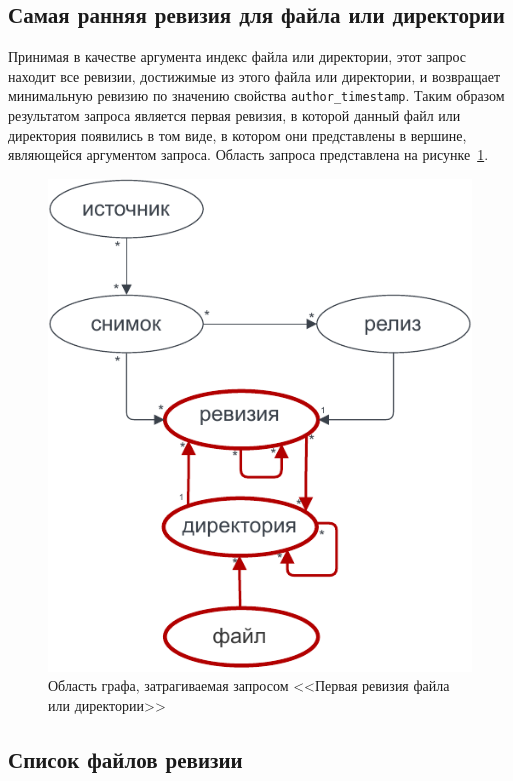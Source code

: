 \documentclass[times,specification,annotation]{itmo-student-thesis}
\begin{document}
\subsection{Самая ранняя ревизия для файла или директории}

Принимая в качестве аргумента индекс файла или директории, этот запрос находит все ревизии, достижимые из этого файла или директории, и возвращает минимальную ревизию по значению свойства \texttt{author\_timestamp}. Таким образом результатом запроса является первая ревизия, в которой данный файл или директория появились в том виде, в котором они представлены в вершине, являющейся аргументом запроса. Область запроса представлена на рисунке~\ref{ecr-graph}.

\begin{figure}[!h]
\caption{Область графа, затрагиваемая запросом <<Первая ревизия файла или директории>>}\label{ecr-graph}
\centering
\includegraphics{img/ecr-graph.pdf}
\end{figure}

\subsection{Список файлов ревизии}
\end{document}

